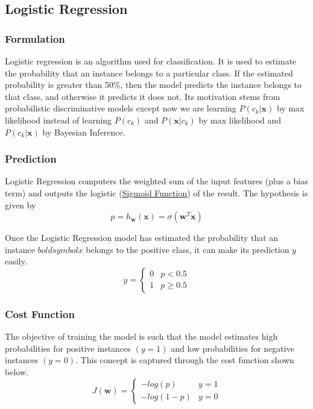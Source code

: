 \documentclass[12pt]{article}
\begin{document}
    \subsection{Logistic Regression}
        \subsubsection{Formulation}
            Logistic regression is an algorithm used for classification. It is used to estimate the probability that an instance belongs to a particular class. If the estimated probability is
            greater than 50\%, then the model predicts the instance belongs to that class, and otherwise it predicts it does not. Its motivation stems from probabilistic discriminative models except 
            now we are learning $P(c_k|\boldsymbol{x})$ by max likelihood instead of learning $P(c_k)$ and $P(\boldsymbol{x}|c_k)$ by max likelihood and $P(c_k|\boldsymbol{x})$ by Bayesian Inference.

        \subsubsection{Prediction}
            Logistic Regression computers the weighted sum of the input features (plus a bias term) and outputs the logistic (\hyperlink{sigmoid function}{Sigmoid Function}) of the result. The hypothesis is given by
            $$ p = h_{\boldsymbol{w}}(\boldsymbol{x}) = \sigma(\boldsymbol{w}^T\boldsymbol{x}) $$
            
            Once the Logistic Regression model has estimated the probability that an instance $boldsymbol{x}$ belongs to the positive class, it can make its prediction $y$ easily.
            \[ y = 
                \begin{cases} 
                    0 & p < 0.5 \\
                    1 & p\geq 0.5 
                \end{cases}
            \]
        
        \subsubsection{Cost Function}
            The objective of training the model is such that the model estimates high probabilities for positive instances $(y = 1)$ and low probabilities for negative instances $(y = 0)$.
            This concept is captured through the cost function shown below.
            \[ J(\boldsymbol{w}) = 
                \begin{cases}
                    -log(p) & y = 1 \\
                    -log(1-p) & y = 0
                \end{cases}
            \]
            
\end{document}
